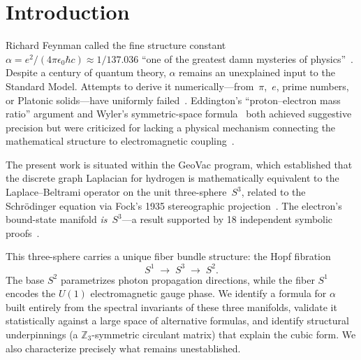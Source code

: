 \documentclass[aps,prl,twocolumn,superscriptaddress]{revtex4-2}
\begin{document}
\maketitle

\section{Introduction}

Richard Feynman called the fine structure constant
$\alpha = e^2/(4\pi\epsilon_0\hbar c) \approx 1/137.036$ ``one of the
greatest damn mysteries of physics''~\cite{feynman1985}. Despite a
century of quantum theory, $\alpha$ remains an unexplained input to
the Standard Model. Attempts to derive it
numerically---from~$\pi$,~$e$, prime numbers, or Platonic
solids---have uniformly failed~\cite{eddington1935,barrow2002}.
Eddington's ``proton--electron mass ratio'' argument and Wyler's
symmetric-space formula~\cite{wyler1969} both achieved suggestive
precision but were criticized for lacking a physical mechanism
connecting the mathematical structure to electromagnetic
coupling~\cite{robertson1971}.

The present work is situated within the GeoVac program, which
established that the discrete graph Laplacian for hydrogen is
mathematically equivalent to the Laplace--Beltrami operator on the
unit three-sphere~$S^3$, related to the Schr\"odinger equation via
Fock's 1935 stereographic projection~\cite{paper7}. The electron's
bound-state manifold \textit{is}~$S^3$---a result supported by 18
independent symbolic proofs~\cite{paper7}.

This three-sphere carries a unique fiber bundle structure: the Hopf
fibration~\cite{hopf1931,urbantke2003}
\begin{equation}\label{eq:hopf}
  S^1 \;\longrightarrow\; S^3 \;\longrightarrow\; S^2.
\end{equation}
The base $S^2$ parametrizes photon propagation directions, while the
fiber $S^1$ encodes the $U(1)$ electromagnetic gauge phase. We
identify a formula for $\alpha$ built entirely from the spectral
invariants of these three manifolds, validate it statistically against
a large space of alternative formulas, and identify structural
underpinnings (a $\mathbb{Z}_3$-symmetric circulant matrix) that
explain the cubic form. We also characterize precisely what remains
unestablished.
\end{document}
